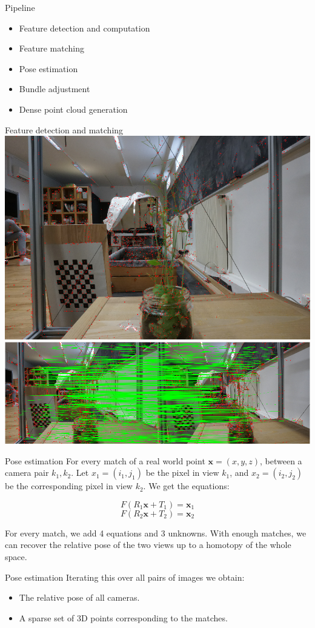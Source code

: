 \documentclass{beamer}
\begin{document}
\begin{frame}{Pipeline}
    \begin{itemize}
        \item Feature detection and computation
        \item Feature matching
        \item Pose estimation
        \item Bundle adjustment
        \item Dense point cloud generation
    \end{itemize}
\end{frame}
\begin{frame}{Feature detection and matching}
    \centering
         \includegraphics[width=.5\textwidth]{images/sift.png}
         \includegraphics[width=\textwidth]{images/matches.png}
\end{frame}
\begin{frame}{Pose estimation}
    For every match of a real world point $\mathbf{x} = (x, y, z)$, between a camera pair $k_1, k_2$. Let $x_1 = (i_1, j_1)$ be the pixel in view $k_1$, and $x_2 = (i_2, j_2)$ be the corresponding pixel in view $k_2$. We get the equations:

    $$F(R_1 \mathbf{x} + T_1) = \mathbf{x}_1$$
    $$F(R_2 \mathbf{x} + T_2) = \mathbf{x}_2$$

    For every match, we add 4 equations and 3 unknowns. With enough matches, we can recover the relative pose of the two views up to a homotopy of the whole space.
\end{frame}
\begin{frame}{Pose estimation}
    Iterating this over all pairs of images we obtain:
    \begin{itemize}
        \item The relative pose of all cameras.
        \item A sparse set of 3D points corresponding to the matches.
    \end{itemize}
\end{frame}
\end{document}

